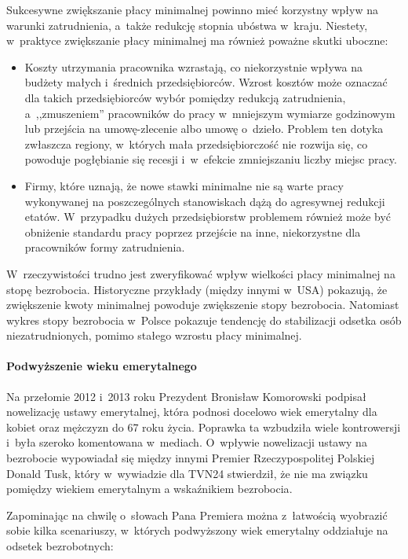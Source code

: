 \documentclass[12pt]{article}
\begin{document}
    Sukcesywne zwiększanie płacy minimalnej powinno mieć korzystny wpływ na warunki zatrudnienia, a~także redukcję stopnia ubóstwa w~kraju. Niestety, w~praktyce zwiększanie płacy minimalnej ma również poważne skutki uboczne:
    
    \begin{itemize}
        \item Koszty utrzymania pracownika wzrastają, co niekorzystnie wpływa na budżety małych i~średnich przedsiębiorców. Wzrost kosztów może oznaczać dla takich przedsiębiorców wybór pomiędzy redukcją zatrudnienia, a~,,zmuszeniem'' pracowników do pracy w~mniejszym wymiarze godzinowym lub przejścia na umowę-zlecenie albo umowę o~dzieło. Problem ten dotyka zwłaszcza regiony, w~których mała przedsiębiorczość nie rozwija się, co powoduje pogłębianie się recesji i~w~efekcie zmniejszaniu liczby miejsc pracy.
        \item Firmy, które uznają, że nowe stawki minimalne nie są warte pracy wykonywanej na poszczególnych stanowiskach dążą do agresywnej redukcji etatów. W~przypadku dużych przedsiębiorstw problemem również może być obniżenie standardu pracy poprzez przejście na inne, niekorzystne dla pracowników formy zatrudnienia.
    \end{itemize}

    W~rzeczywistości trudno jest zweryfikować wpływ wielkości płacy minimalnej na stopę bezrobocia. Historyczne przykłady (między innymi w~USA) pokazują, że zwiększenie kwoty minimalnej powoduje zwiększenie stopy bezrobocia. Natomiast wykres stopy bezrobocia w~Polsce pokazuje tendencję do stabilizacji odsetka osób niezatrudnionych, pomimo stałego wzrostu płacy minimalnej.
    
    \paragraph{Podwyższenie wieku emerytalnego}
    
    Na przełomie 2012 i~2013 roku Prezydent Bronisław Komorowski podpisał nowelizację ustawy emerytalnej, która podnosi docelowo wiek emerytalny dla kobiet oraz mężczyzn do 67 roku życia. Poprawka ta wzbudziła wiele kontrowersji i~była szeroko komentowana w~mediach. O~wpływie nowelizacji ustawy na bezrobocie wypowiadał się między innymi Premier Rzeczypospolitej Polskiej Donald Tusk, który w~wywiadzie dla TVN24 stwierdził, że nie ma związku pomiędzy wiekiem emerytalnym a wskaźnikiem bezrobocia\cite{premier}.
    
    Zapominając na chwilę o~słowach Pana Premiera można z~łatwością wyobrazić sobie kilka scenariuszy, w~których podwyższony wiek emerytalny oddziałuje na odsetek bezrobotnych:
    
\end{document}
